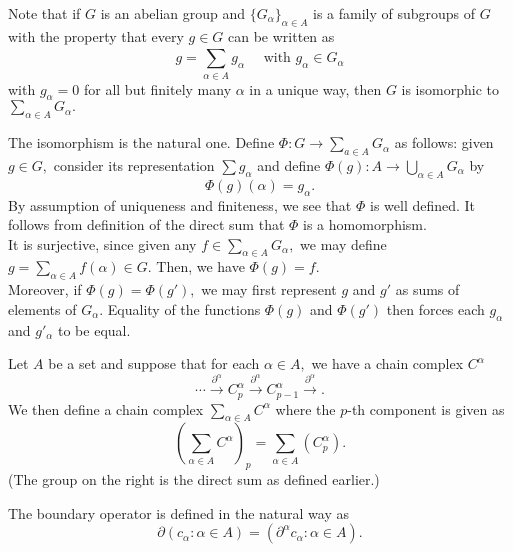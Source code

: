 \documentclass[12pt]{article}
\begin{document}
Note that if $G$ is an abelian group and $\{G_\alpha\}_{\alpha\in A}$ is a family of subgroups of $G$ with the property that every $g \in G$ can be written as
\begin{equation*} 
	g = \sum_{\alpha\in A}^{}g_\alpha \quad \text{ with } g_\alpha \in G_\alpha
\end{equation*}
with $g_\alpha = 0$ for all but finitely many $\alpha$ in a unique way, then $G$ is isomorphic to $\sum_{\alpha\in A}^{}G_\alpha.$

The isomorphism is the natural one. Define $\Phi:G\to\sum_{a\in A}^{}G_\alpha$ as follows: given $g \in G,$ consider its representation $\sum g_\alpha$ and define $\Phi(g):A\to\bigcup_{\alpha\in A}G_\alpha$ by
\begin{equation*} 
	\Phi(g)(\alpha) = g_\alpha.
\end{equation*}
By assumption of uniqueness and finiteness, we see that $\Phi$ is well defined. It follows from definition of the direct sum that $\Phi$ is a homomorphism. \\
It is surjective, since given any $f \in \sum_{\alpha\in A}^{}G_\alpha,$ we may define $g = \sum_{\alpha\in A}^{}f(\alpha) \in G.$ Then, we have $\Phi(g) = f.$\\
Moreover, if $\Phi(g) = \Phi(g'),$ we may first represent $g$ and $g'$ as sums of elements of $G_\alpha.$ Equality of the functions $\Phi(g)$ and $\Phi(g')$ then forces each $g_\alpha$ and $g'_\alpha$ to be equal.

\begin{defn}
	Let $A$ be a set and suppose that for each $\alpha\in A,$ we have a chain complex $C^{\alpha}$
	\begin{equation*} 
		\cdots \overset{\partial^\alpha}{\longrightarrow} C^\alpha_p \overset{\partial^\alpha}{\longrightarrow} C^\alpha_{p-1} \overset{\partial^\alpha}{\longrightarrow}.
	\end{equation*}
	We then define a chain complex $\sum_{\alpha \in A}^{}C^\alpha$ where the $p$-th component is given as
	\begin{equation*} 
		\left(\sum_{\alpha \in A}^{}C^\alpha\right)_{p} = \sum_{\alpha \in A}^{}\left(C^\alpha_p\right).
	\end{equation*}
	(The group on the right is the direct sum as defined earlier.)

	The boundary operator is defined in the natural way as
	\begin{equation*} 
		\partial(c_\alpha : \alpha \in A) = (\partial^\alpha c_\alpha : \alpha \in A).
	\end{equation*}
\end{defn}
\end{document}
